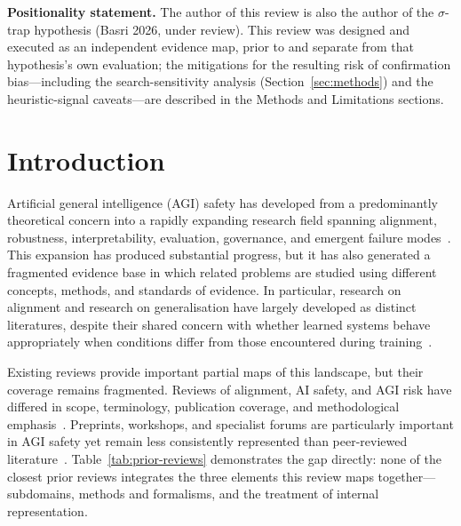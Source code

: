 \maketitle


\noindent\textbf{Positionality statement.} The author of this review is also the author
of the $\sigma$-trap hypothesis (Basri 2026, under review). This review was designed
and executed as an independent evidence map, prior to and separate from that
hypothesis's own evaluation; the mitigations for the resulting risk of confirmation
bias---including the search-sensitivity analysis (Section~\ref{sec:methods}) and the
heuristic-signal caveats---are described in the Methods and Limitations sections.

\section{Introduction}\label{sec:introduction}

Artificial general intelligence (AGI) safety has developed from a predominantly theoretical concern into a rapidly expanding research field spanning alignment, robustness, interpretability, evaluation, governance, and emergent failure modes~\cite{hendrycks2023overview,hendrycks2021unsolved,ji2023survey}. This expansion has produced substantial progress, but it has also generated a fragmented evidence base in which related problems are studied using different concepts, methods, and standards of evidence. In particular, research on alignment and research on generalisation have largely developed as distinct literatures, despite their shared concern with whether learned systems behave appropriately when conditions differ from those encountered during training~\cite{amodei2016concrete,geirhos2020shortcut,lake2018generalization,lake2023compositional,hupkes2023taxonomy,keysers2020measuring,liu2021towards,zhou2023domain,wang2022generalizing,karbasian2025unified,matta2024systematic}.

Existing reviews provide important partial maps of this landscape, but their coverage remains fragmented. Reviews of alignment, AI safety, and AGI risk have differed in scope, terminology, publication coverage, and methodological emphasis~\cite{triantafyllopoulos2026value,shen2024bidirectional,gyevnar2025aisafety,mclean2021risks,slattery2024ai,ahmed2024future}. Preprints, workshops, and specialist forums are particularly important in AGI safety yet remain less consistently represented than peer-reviewed literature~\cite{gyevnar2025aisafety}. Table~\ref{tab:prior-reviews} demonstrates the gap directly: none of the closest prior reviews integrates the three elements this review maps together---subdomains, methods and formalisms, and the treatment of internal representation.

